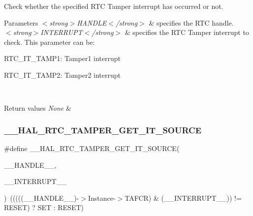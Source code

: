 Check whether the specified R\+TC Tamper interrupt has occurred or not. 


\begin{DoxyParams}{Parameters}
{\em $<$strong$>$\+H\+A\+N\+D\+L\+E$<$/strong$>$} & specifies the R\+TC handle. \\
\hline
{\em $<$strong$>$\+I\+N\+T\+E\+R\+R\+U\+P\+T$<$/strong$>$} & specifies the R\+TC Tamper interrupt to check. This parameter can be\+: \begin{DoxyItemize}
\item R\+T\+C\+\_\+\+I\+T\+\_\+\+T\+A\+M\+P1\+: Tamper1 interrupt \item R\+T\+C\+\_\+\+I\+T\+\_\+\+T\+A\+M\+P2\+: Tamper2 interrupt \end{DoxyItemize}
\\
\hline
\end{DoxyParams}

\begin{DoxyRetVals}{Return values}
{\em None} & \\
\hline
\end{DoxyRetVals}
\mbox{\label{group___r_t_c_ex___tamper_gae1de3775214da8d45c4625d4ad2b6f28}} 
\subsubsection{\texorpdfstring{\+\_\+\+\_\+\+H\+A\+L\+\_\+\+R\+T\+C\+\_\+\+T\+A\+M\+P\+E\+R\+\_\+\+G\+E\+T\+\_\+\+I\+T\+\_\+\+S\+O\+U\+R\+CE}{\_\_HAL\_RTC\_TAMPER\_GET\_IT\_SOURCE}}
{\footnotesize\ttfamily \#define \+\_\+\+\_\+\+H\+A\+L\+\_\+\+R\+T\+C\+\_\+\+T\+A\+M\+P\+E\+R\+\_\+\+G\+E\+T\+\_\+\+I\+T\+\_\+\+S\+O\+U\+R\+CE(\begin{DoxyParamCaption}\item[{}]{\+\_\+\+\_\+\+H\+A\+N\+D\+L\+E\+\_\+\+\_\+,  }\item[{}]{\+\_\+\+\_\+\+I\+N\+T\+E\+R\+R\+U\+P\+T\+\_\+\+\_\+ }\end{DoxyParamCaption})~(((((\+\_\+\+\_\+\+H\+A\+N\+D\+L\+E\+\_\+\+\_\+)-\/$>$Instance-\/$>$T\+A\+F\+CR) \& (\+\_\+\+\_\+\+I\+N\+T\+E\+R\+R\+U\+P\+T\+\_\+\+\_\+)) != R\+E\+S\+ET) ? S\+ET \+: R\+E\+S\+ET)}



